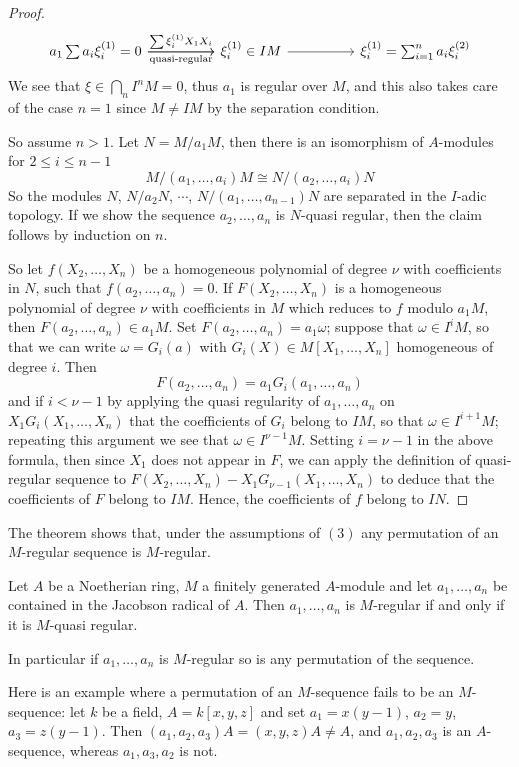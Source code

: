 \begin{proof}
\[\begin{tikzcd}
a_1\sum a_i\xi_i^{(1)}=0\ar[rr,"\sum\xi_i^{(1)}X_1X_i"]\ar[rr,swap,"\text{quasi-regular}"]&&\xi_i^{(1)}\in IM\ar[rr]&&\xi_i^{(1)}=\sum_{i=1}^{n}a_i\xi_i^{(2)}
\end{tikzcd}\]
We see that $\xi\in\bigcap_nI^nM=0$, thus $a_1$ is regular over $M$, and this also takes care of the case $n=1$ since $M\neq IM$ by the separation condition.\par
So assume $n>1$. Let $N=M/a_1M$, then there is an isomorphism of
$A$-modules for $2\leq i\leq n-1$
\[M/(a_1,\dots,a_i)M\cong N/(a_2,\dots,a_i)N\]
So the modules $N$, $N/a_2N$, $\cdots$, $N/(a_1,\dots,a_{n-1})N$ are separated in the $I$-adic topology. If we show the sequence $a_2,\dots,a_n$ is $N$-quasi regular, then the claim follows by induction on $n$.\par
So let $f(X_2,\dots,X_n)$ be a homogeneous polynomial of degree $\nu$ with coefficients in $N$, such that $f(a_2,\dots,a_n)=0$. If $F(X_2,\dots,X_n)$ is a homogeneous polynomial of degree $\nu$ with coefficients in $M$ which reduces to $f$ modulo $a_1M$, then $F(a_2,\dots,a_n)\in a_1M$. Set $F(a_2,\dots,a_n)=a_1\omega$; suppose that $\omega\in I^iM$, so that we can write $\omega=G_i(a)$ with $G_i(X)\in M[X_1,\dots,X_n]$ homogeneous of degree $i$. Then
\[F(a_2,\dots,a_n)=a_1G_i(a_1,\dots,a_n)\]
and if $i<\nu-1$ by applying the quasi regularity of $a_1,\dots,a_n$ on
$X_1G_i(X_1,\dots,X_n)$ that the coefficients of $G_i$ belong to $IM$, so that $\omega\in I^{i+1}M$; repeating this argument we see that $\omega\in I^{\nu-1}M$. Setting $i=\nu-1$ in the above formula, then since $X_1$ does not appear in $F$, we can apply the definition of quasi-regular sequence to $F(X_2,\dots,X_n)-X_1G_{\nu-1}(X_1,\dots,X_n)$ to deduce that the coefficients of $F$ belong to $IM$. Hence, the coefficients of $f$ belong to $IN$.
\end{proof}
The theorem shows that, under the assumptions of $(3)$ any permutation of an $M$-regular sequence is $M$-regular.
\begin{corollary}\label{regular permute}
Let $A$ be a Noetherian ring, $M$ a finitely generated $A$-module and let $a_1,\dots,a_n$ be contained in the Jacobson radical of $A$. Then $a_1,\dots,a_n$ is $M$-regular if and only if it is $M$-quasi regular.\par
In particular if $a_1,\dots,a_n$ is $M$-regular so is any permutation of the sequence.
\end{corollary}
\begin{remark}\label{regular permute eg}
Here is an example where a permutation of an $M$-sequence fails to be an $M$-sequence: let $k$ be a field, $A=k[x,y,z]$ and set $a_1=x(y-1)$, $a_2=y$, $a_3=z(y-1)$. Then $(a_1,a_2,a_3)A=(x,y,z)A\neq A$, and $a_1,a_2,a_3$ is an $A$-sequence, whereas $a_1,a_3,a_2$ is not.
\end{remark}
